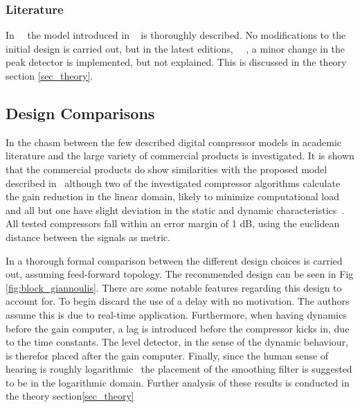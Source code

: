 \documentclass[../main2.tex]{subfiles}
\begin{document}
\subsubsection{Literature}
In~\cite{zolzer1997digital}~\cite{dafx02} the model introduced in ~\cite{mcnally1984dynamic} is thoroughly described. No modifications to the initial design is carried out, but in the latest editions,~\cite{zoelzer2008digital} ~\cite{dafx11}, a minor change in the peak detector is implemented, but not explained. This is discussed in the theory section \ref{sec_theory}.
\subsection{Design Comparisons} \label{background_design_comp}
In \cite{bitzer2006parameter} the chasm between the few described digital compressor models in academic literature and the large variety of commercial products is investigated. It is shown that the commercial products do show similarities with the proposed model described in~\cite{mcnally1984dynamic}\cite{zolzer2008digital}\cite{dafx11} although two of the investigated compressor algorithms calculate the gain reduction in the linear domain, likely to minimize computational load and all but one have slight deviation in the static and dynamic characteristics~\cite{bitzer2006parameter}. All tested compressors fall within an error margin of 1 dB, using the euclidean distance between the signals as metric.

In \cite{reiss2012tutorial} a thorough formal comparison between the different design choices is carried out, assuming feed-forward topology. The recommended design can be seen in Fig \ref{fig:block_giannoulis}. There are some notable features regarding this design to account for. To begin \cite{reiss2012tutorial} discard the use of a delay with no motivation. The authors assume this is due to real-time application. Furthermore, when having dynamics before the gain computer, a lag is introduced before the compressor kicks in, due to the time constants. The level detector, in the sense of the dynamic behaviour, is therefor placed after the gain computer. Finally, since the human sense of hearing is roughly logarithmic~\cite{fastl2007psychoacoustics} the placement of the smoothing filter is suggested to be in the logarithmic domain. Further analysis of these results is conducted in the theory section\ref{sec_theory}
 
\end{document}
